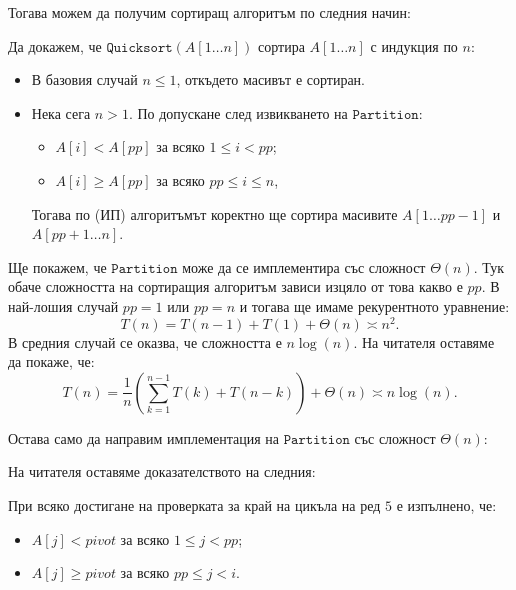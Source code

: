 Тогава можем да получим сортиращ алгоритъм по следния начин:

Да докажем, че $\mathtt{Quicksort}(A[1 \dots n])$ сортира $A[1 \dots n]$ с индукция по $n$:
\begin{itemize}
    \item В базовия случай $n \leq 1$, откъдето масивът е сортиран.
    \item Нека сега $n > 1$.
          По допускане след извикването на $\mathtt{Partition}$:
          \begin{itemize}
              \item $A[i] < A[pp]$ за всяко $1 \leq i < pp$;
              \item $A[i] \geq A[pp]$ за всяко $pp \leq i \leq n$,
          \end{itemize}
          Тогава по (ИП) алгоритъмът коректно ще сортира масивите $A[1 \dots pp - 1]$ и $A[pp + 1 \dots n]$.
\end{itemize}

Ще покажем, че $\mathtt{Partition}$ може да се имплементира със сложност $\Theta(n)$.
Тук обаче сложността на сортиращия алгоритъм зависи изцяло от това какво е $pp$.
В най-лошия случай $pp = 1$ или $pp = n$ и тогава ще имаме рекурентното уравнение:
\[
    T(n) = T(n - 1) + T(1) + \Theta(n) \asymp n^2.
\]
В средния случай се оказва, че сложността е $n \log(n)$.
На читателя оставяме да покаже, че:
\[
    T(n) = \frac{1}{n} \left( \sum\limits_{k = 1}^{n - 1} T(k) + T(n - k) \right) + \Theta(n) \asymp n \log(n).
\]

Остава само да направим имплементация на $\mathtt{Partition}$ със сложност $\Theta(n)$:

На читателя оставяме доказателството на следния:
\begin{invariant}
    При всяко достигане на проверката за край на цикъла на ред $5$ е изпълнено, че:
    \begin{itemize}
        \item $A[j] < pivot$ за всяко $1 \leq j < pp$;
        \item $A[j] \geq pivot$ за всяко $pp \leq j < i$.
    \end{itemize}
\end{invariant}

